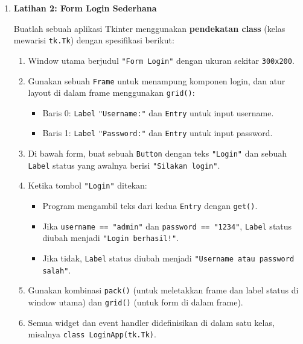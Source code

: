 \begin{enumerate}
	  \begin{promptterarah}
	  Saya sedang membuat game tebak angka dengan Tkinter memakai pendekatan kelas. Jangan tuliskan kodenya. Tanyakan widget apa saja yang saya butuhkan dan metode mana yang dijalankan saat tombol ditekan, lalu beri petunjuk bila keliru. Setelah saya mengirim kode, periksa dan tunjukkan bagian yang keliru tanpa memberi kode yang benar.
	  \end{promptterarah}
	\item \textbf{Latihan 2: Form Login Sederhana}

  Buatlah sebuah aplikasi Tkinter menggunakan \textbf{pendekatan class} (kelas mewarisi \texttt{tk.Tk}) dengan spesifikasi berikut:
  \begin{enumerate}
    \item Window utama berjudul \texttt{"Form Login"} dengan ukuran sekitar \texttt{300x200}.
    \item Gunakan sebuah \texttt{Frame} untuk menampung komponen login, dan atur layout di dalam frame menggunakan \texttt{grid()}:
          \begin{itemize}
            \item Baris 0: \texttt{Label} \texttt{"Username:"} dan \texttt{Entry} untuk input username.
            \item Baris 1: \texttt{Label} \texttt{"Password:"} dan \texttt{Entry} untuk input password.
          \end{itemize}
    \item Di bawah form, buat sebuah \texttt{Button} dengan teks \texttt{"Login"} dan sebuah \texttt{Label} status yang awalnya berisi \texttt{"Silakan login"}.
    \item Ketika tombol \texttt{"Login"} ditekan:
          \begin{itemize}
            \item Program mengambil teks dari kedua \texttt{Entry} dengan \texttt{get()}.
            \item Jika \texttt{username == "admin"} dan \texttt{password == "1234"}, \texttt{Label} status diubah menjadi \texttt{"Login berhasil!"}.
            \item Jika tidak, \texttt{Label} status diubah menjadi \texttt{"Username atau password salah"}.
          \end{itemize}
    \item Gunakan kombinasi \texttt{pack()} (untuk meletakkan frame dan label status di window utama) dan \texttt{grid()} (untuk form di dalam frame).
    \item Semua widget dan event handler didefinisikan di dalam satu kelas, misalnya \texttt{class LoginApp(tk.Tk)}.

\end{enumerate}
\end{enumerate}
